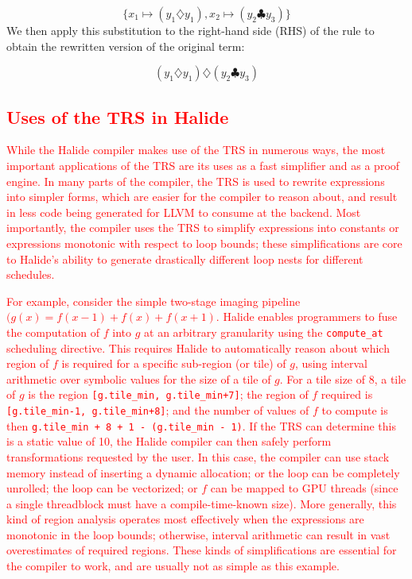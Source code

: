 \documentclass[acmsmall,review]{acmart}\settopmatter{printfolios=true,printccs=false,printacmref=false}
\newcommand{\modified}[1]{\textcolor{red}{{#1}}}
\begin{document}
\[
\{ x_1 \mapsto (y_1 \diamondsuit y_1), x_2 \mapsto (y_2 \clubsuit y_3) \}
\]
We then apply this substitution to the right-hand side (RHS) of the rule to obtain the rewritten version of the original term:

\[ 
(y_1 \diamondsuit y_1) \diamondsuit (y_2 \clubsuit y_3)
\]

\subsection{\modified{Uses of the TRS in Halide}}
\label{sec:uses-of-trs}
\modified{While the Halide compiler makes use of the TRS in numerous ways, the most important
  applications of the TRS are its uses as a fast simplifier and as a proof engine.  
  In many parts of the compiler, the TRS is used to rewrite expressions into simpler forms,
  which are easier for the compiler to reason about, and result in less code being generated for
  LLVM to consume at the backend.  Most importantly, the compiler uses the TRS to simplify expressions
  into constants or expressions monotonic with respect to loop bounds; these simplifications are core to Halide's
  ability to generate drastically different loop nests for different schedules.}

\modified{For example, consider the simple two-stage imaging pipeline $(g(x) = f(x - 1) + f(x) + f(x + 1)$.
  Halide enables programmers to fuse the computation of $f$ into $g$ at an arbitrary granularity
  using the \texttt{compute\_at} scheduling directive.  This requires Halide to automatically reason
  about which region of $f$ is required for a specific sub-region (or tile) of $g$, using interval
  arithmetic over symbolic values for the size of a tile of $g$.  For a tile size of 8, a tile of $g$
  is the region \texttt{[g.tile\_min, g.tile\_min+7]};  the region of $f$ required is
  \texttt{[g.tile\_min-1, g.tile\_min+8]}; and the number of values of $f$ to compute is then
  \texttt{g.tile\_min + 8 + 1 - (g.tile\_min - 1)}.  If the TRS can determine this is a static value
  of 10, the Halide compiler can then safely perform transformations requested by the user.  In this
  case, the compiler can use stack memory instead of inserting a dynamic allocation; or the loop can be
  completely unrolled; the loop can be vectorized; or $f$ can be mapped to GPU threads (since a single
  threadblock must have a compile-time-known size).  More generally, this kind of region analysis
  operates most effectively when the expressions are monotonic in the loop bounds; otherwise, interval
  arithmetic can result in vast overestimates of required regions.  These kinds of simplifications are essential
  for the compiler to work, and are usually not as simple as this example.}
\end{document}
